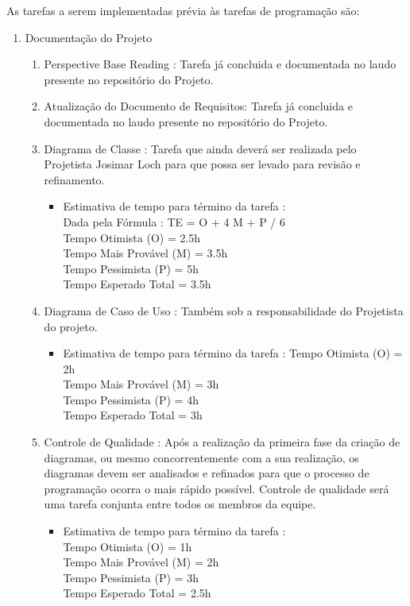 \documentclass[12pt,a4paper,final]{report}
\begin{document}
\newpage
As tarefas a serem implementadas prévia às tarefas de programação são:

\begin{enumerate}
\item Documentação do Projeto
\begin{enumerate}

\item Perspective Base Reading : Tarefa já concluida e documentada no laudo presente no repositório do Projeto.

\item Atualização do Documento de Requisitos: Tarefa já concluida e documentada no laudo presente no repositório do Projeto.

\item Diagrama de Classe : Tarefa que ainda deverá ser realizada pelo Projetista Josimar Loch para que possa ser levado para revisão e refinamento.
\begin{itemize}
\item Estimativa de tempo para término da tarefa : \\
Dada pela Fórmula : TE = O + 4 M + P / 6\\
Tempo Otimista (O) = 2.5h\\
Tempo Mais Provável (M) = 3.5h\\
Tempo Pessimista (P) = 5h\\
Tempo Esperado Total = 3.5h
\end{itemize} 

\item Diagrama de Caso de Uso : Também sob a responsabilidade do Projetista do projeto.
\begin{itemize}
\item Estimativa de tempo para término da tarefa : 
Tempo Otimista (O) = 2h\\
Tempo Mais Provável (M) = 3h\\
Tempo Pessimista (P) = 4h\\
Tempo Esperado Total = 3h
\end{itemize} 

\item Controle de Qualidade : Após a realização da primeira fase da criação de diagramas, ou mesmo concorrentemente com a sua realização, os diagramas devem ser analisados e refinados para que o processo de programação ocorra o mais rápido possível. Controle de qualidade será uma tarefa conjunta entre todos os membros da equipe.
\begin{itemize}
\item Estimativa de tempo para término da tarefa :\\
Tempo Otimista (O) = 1h\\
Tempo Mais Provável (M) = 2h\\
Tempo Pessimista (P) = 3h\\
Tempo Esperado Total = 2.5h
\end{itemize} 


\end{enumerate}
\end{enumerate}
\end{document}

